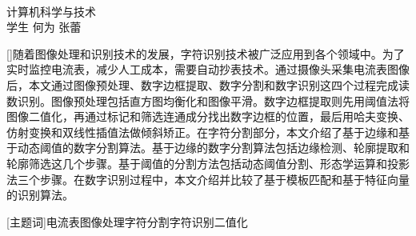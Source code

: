 \begin{center}
\vspace*{18pt}
{\heiti{}\thesistitle}\\[18pt]
\quad 计算机科学与技术\\[12pt]
{\kaishu 学生} \quad 何为  \quad 张蕾\\[24pt]
\end{center}\par

{[{}]随着图像处理和识别技术的发展，字符识别技术被广泛应用到各个领域中。为了实时监控电流表，减少人工成本，需要自动抄表技术。通过摄像头采集电流表图像后，本文通过图像预处理、数字边框提取、数字分割和数字识别这四个过程完成读数识别。图像预处理包括直方图均衡化和图像平滑。数字边框提取则先用阈值法将图像二值化，再通过标记和筛选连通成分找出数字边框的位置，最后用哈夫变换、仿射变换和双线性插值法做倾斜矫正。在字符分割部分，本文介绍了基于边缘和基于动态阈值的数字分割算法。基于边缘的数字分割算法包括边缘检测、轮廓提取和轮廓筛选这几个步骤。基于阈值的分割方法包括动态阈值分割、形态学运算和投影法三个步骤。在数字识别过程中，本文介绍并比较了基于模板匹配和基于特征向量的识别算法。}

\vspace{10pt}

[{\heiti 主题词}]{\kaishu 电流表\quad 图像处理\quad 字符分割\quad 字符识别\quad 二值化\quad}

